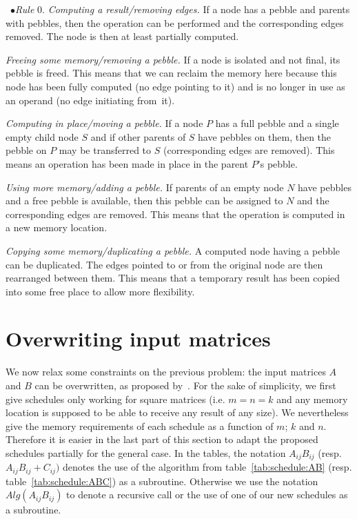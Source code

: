 \documentclass{article}
\begin{document}
\begin{inparaenum}[{\ $\bullet$\xspace\emph{Rule}} 1.]
\item[{\ $\bullet$\xspace\emph{Rule}} 0.] \emph{Computing a result/removing edges.} If a node
has a pebble and parents with pebbles, then the operation can be
performed and the corresponding edges removed. The node is
then at least partially computed.

\item \emph{Freeing some memory/removing a pebble.} If a node is
isolated and not final, its pebble is freed. This means that
we can reclaim the memory here because this node has been fully
computed (no edge pointing to it) and is no longer in use as an
operand (no edge initiating from~it).

\item \emph{Computing in place/moving a pebble.} If a node $P$ has
a full pebble and a single empty child node $S$ and if other
parents of $S$ have pebbles on them, then the pebble on $P$ may
be transferred  to $S$ (corresponding edges are removed). This
means an operation has been made in place in the parent $P$'s pebble.

\item \emph{Using more memory/adding a pebble.} If parents of an empty node $N$ have
pebbles and a free pebble is available, then this pebble can be assigned to $N$ and the
corresponding edges are removed. This means that the operation is
computed in a new memory location.

\item \emph{Copying some memory/duplicating a pebble.} 
A computed node having a pebble can be duplicated. The edges pointed
to or from the original node are then rearranged between them.
This means that a temporary result has been copied into some free
place to allow more flexibility.
\end{inparaenum}
\section{Overwriting input matrices}
\label{sec:overwrite}
We now relax some constraints on the previous problem: the input matrices $A$
and $B$ can be overwritten, as proposed
by~\cite{Kreczmar:1976:Strassen}.
For the sake of simplicity, 
we first give schedules only working for square matrices (i.e. $m=n=k$
and any memory location is supposed to be able to receive any result
of any size).
We nevertheless give the memory requirements of
each schedule as a function of $m$; $k$ and $n$.
Therefore it is easier in the last part of this section to adapt the proposed schedules partially
for the general case. 
In the tables, the notation $A_{ij} B_{ij}$ (resp. $A_{ij} B_{ij} +
C_{ij})$ denotes the use of the algorithm from
table~\ref{tab:schedule:AB} (resp. table~\ref{tab:schedule:ABC}) as a
subroutine. Otherwise we use the notation $Alg(A_{ij} B_{ij})$ to
denote a recursive call or the use of one of our new schedules as a
subroutine.
\end{document}
